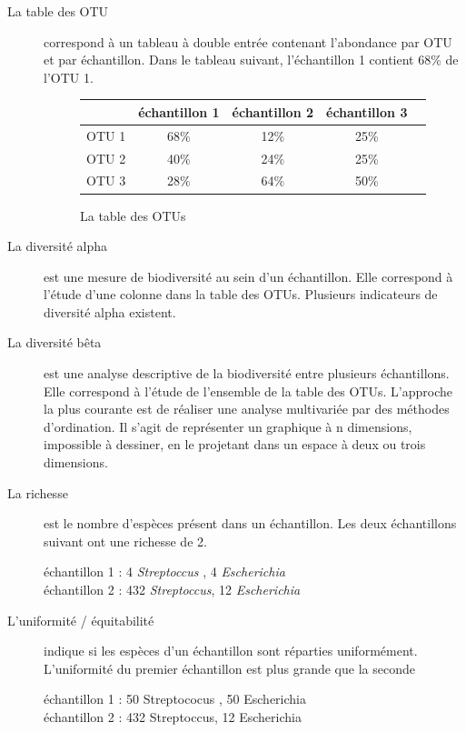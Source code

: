 \documentclass[12pt,a4paper]{article}
\begin{document}
\begin{description}
\item[La table des OTU] correspond à un tableau à double entrée contenant l’abondance par OTU  et par échantillon. Dans le tableau suivant, l'échantillon 1 contient 68\% de l'OTU 1.

\begin{figure}
\begin{center}
\begin{tabular}{|l|c|c|c|c}
  \hline
   & échantillon 1 & échantillon 2 & échantillon 3  \\
  \hline
  OTU 1 & 68\% & 12\% & 25\% \\
  OTU 2 & 40\% & 24\% & 25\% \\
  OTU 3 & 28\% & 64\% & 50\% \\

  \hline
\end{tabular}
\end{center}
\caption{La table des OTUs}
\end{figure}

\item[La diversité alpha] est une mesure de biodiversité au sein d’un échantillon. Elle correspond à l’étude d’une colonne dans la table des OTUs. Plusieurs indicateurs de diversité alpha existent.

\item[La diversité bêta] est une analyse descriptive de la biodiversité entre plusieurs échantillons. Elle correspond à l’étude de l’ensemble de la table des OTUs. L’approche la plus courante est de réaliser une analyse multivariée par des méthodes d’ordination. Il s’agit de représenter un graphique à n dimensions, impossible à dessiner, en le projetant dans un espace à deux ou trois dimensions.

\item[La richesse] est le nombre d’espèces présent dans un échantillon. Les deux échantillons suivant ont une richesse de 2.

échantillon 1  : 4 \textit{Streptoccus} , 4 \textit{Escherichia}  \\ 
échantillon 2 : 432 \textit{Streptoccus}, 12 \textit{Escherichia} 

\item[L'uniformité / équitabilité] indique si les espèces d’un échantillon sont réparties uniformément.
L'uniformité du premier échantillon est plus grande que la seconde

échantillon 1  : 50 Streptococus , 50 Escherichia  \\ 
échantillon 2 : 432 Streptoccus, 12 Escherichia 



\end{description}
\end{document}
